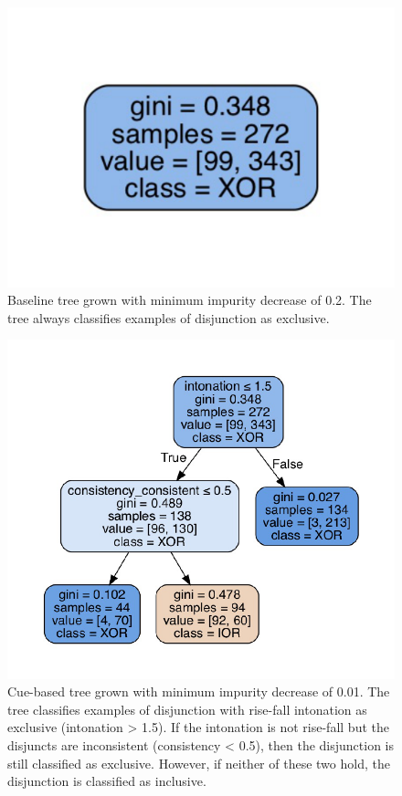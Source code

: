 \documentclass[,man,floatsintext]{apa6}
\begin{document}
\begin{figure}
\centering
\includegraphics{figs/binaryBaseline-1.pdf}
\caption{\label{fig:binaryBaseline}Baseline tree grown with minimum impurity decrease of 0.2. The tree always classifies examples of disjunction as exclusive.}
\end{figure}

\begin{figure}
\centering
\includegraphics{figs/binaryCueBased-1.pdf}
\caption{\label{fig:binaryCueBased}Cue-based tree grown with minimum impurity decrease of 0.01. The tree classifies examples of disjunction with rise-fall intonation as exclusive (intonation \textgreater{} 1.5). If the intonation is not rise-fall but the disjuncts are inconsistent (consistency \textless{} 0.5), then the disjunction is still classified as exclusive. However, if neither of these two hold, the disjunction is classified as inclusive.}
\end{figure}
\end{document}
